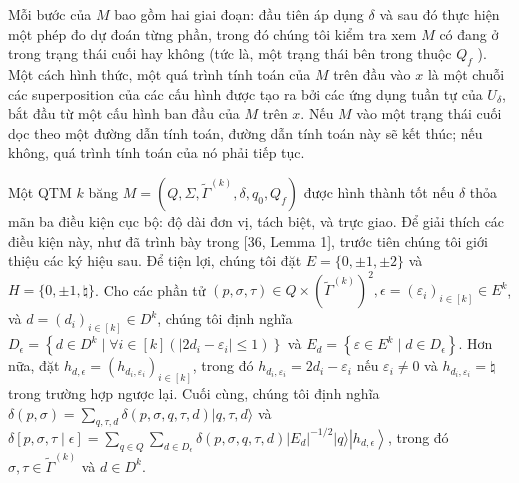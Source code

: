 \documentclass[10pt]{article}
\begin{document}
Mỗi bước của $M$ bao gồm hai giai đoạn: đầu tiên áp dụng $\delta$ và sau đó thực hiện một phép đo dự đoán từng phần, trong đó chúng tôi kiểm tra xem $M$ có đang ở trong trạng thái cuối hay không (tức là, một trạng thái bên trong thuộc $Q_{f}$ ). Một cách hình thức, một quá trình tính toán của $M$ trên đầu vào $x$ là một chuỗi các superposition của các cấu hình được tạo ra bởi các ứng dụng tuần tự của $U_{\delta}$, bắt đầu từ một cấu hình ban đầu của $M$ trên $x$. Nếu $M$ vào một trạng thái cuối dọc theo một đường dẫn tính toán, đường dẫn tính toán này sẽ kết thúc; nếu không, quá trình tính toán của nó phải tiếp tục.

Một QTM $k$ băng $M=\left(Q, \Sigma, \tilde{\Gamma}^{(k)}, \delta, q_{0}, Q_{f}\right)$ được hình thành tốt nếu $\delta$ thỏa mãn ba điều kiện cục bộ: độ dài đơn vị, tách biệt, và trực giao. Để giải thích các điều kiện này, như đã trình bày trong [36, Lemma 1], trước tiên chúng tôi giới thiệu các ký hiệu sau. Để tiện lợi, chúng tôi đặt $E=\{0, \pm 1, \pm 2\}$ và $H=\{0, \pm 1, \natural\}$. Cho các phần tử $(p, \sigma, \tau) \in Q \times\left(\tilde{\Gamma}^{(k)}\right)^{2}, \epsilon=\left(\varepsilon_{i}\right)_{i \in[k]} \in E^{k}$, và $d=\left(d_{i}\right)_{i \in[k]} \in D^{k}$, chúng tôi định nghĩa $D_{\epsilon}=\left\{d \in D^{k} \mid \forall i \in\right. \left.[k]\left(\left|2 d_{i}-\varepsilon_{i}\right| \leq 1\right)\right\}$ và $E_{d}=\left\{\varepsilon \in E^{k} \mid d \in D_{\epsilon}\right\}$. Hơn nữa, đặt $h_{d, \epsilon}=\left(h_{d_{i}, \varepsilon_{i}}\right)_{i \in[k]}$, trong đó $h_{d_{i}, \varepsilon_{i}}=2 d_{i}-\varepsilon_{i}$ nếu $\varepsilon_{i} \neq 0$ và $h_{d_{i}, \varepsilon_{i}}=\natural$ trong trường hợp ngược lại. Cuối cùng, chúng tôi định nghĩa $\delta(p, \sigma)=\sum_{q, \tau, d} \delta(p, \sigma, q, \tau, d)|q, \tau, d\rangle$ và $\delta[p, \sigma, \tau \mid \epsilon]= \sum_{q \in Q} \sum_{d \in D_{\epsilon}} \delta(p, \sigma, q, \tau, d)\left|E_{d}\right|^{-1 / 2}|q\rangle\left|h_{d, \epsilon}\right\rangle$, trong đó $\sigma, \tau \in \tilde{\Gamma}^{(k)}$ và $d \in D^{k}$.
\end{document}
